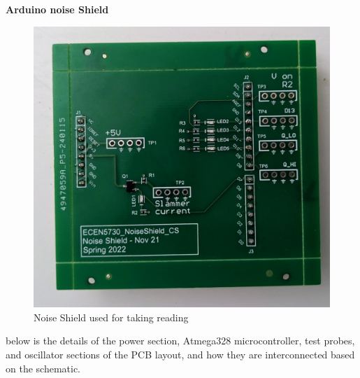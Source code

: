 \documentclass[a4paper,11pt]{article}%
\begin{document}
\textbf{Arduino noise Shield}

\begin{figure}[H]
	\centering
	\includegraphics[scale=0.2]{figures/arduino_shield.jpg}
	\caption{Noise Shield used for taking reading}
\end{figure}



below is the details of the power section, Atmega328 microcontroller, test probes, and oscillator sections of the PCB layout, and how they are interconnected based on the schematic.
\end{document}
